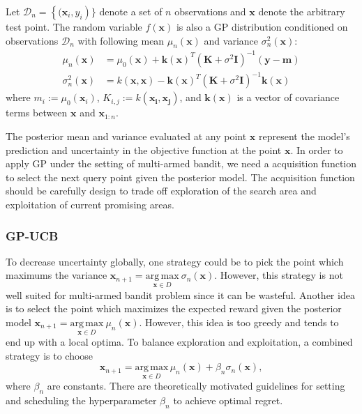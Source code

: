 \documentclass{article}
\begin{document}
Let $\mathcal{D}_n = \left \{( \mathbf{x}_i, y_i \right )\}$ denote a
set of $n$ observations and $\mathbf{x}$ denote the arbitrary test
point. The random variable $f(\mathbf{x})$ is also a GP distribution
conditioned on observations $\mathcal{D}_n$ with following mean
$\mu_n(\mathbf{x})$ and variance $\sigma_n^2(\mathbf{x})$:
\begin{align}
 \mu_n(\mathbf{x}) &= \mu_0(\mathbf{x}) +
                     \mathbf{k}(\mathbf{x})^T(\mathbf{K}+\sigma^2\mathbf{I})^{-1}(\mathbf{y}-\mathbf{m})
  \\
  \sigma_n^2(\mathbf{x}) &= k(\mathbf{x}, \mathbf{x}) -
                           \mathbf{k}(\mathbf{x})^T(\mathbf{K}+\sigma^2\mathbf{I})^{-1}\mathbf{k}(\mathbf{x})
\end{align}
where $m_i := \mu_0(\mathbf{x}_i)$, $K_{i,j} := k(\mathbf{x_i, x_j})$,
and $\mathbf{k}(\mathbf{x})$ is a vector of covariance terms between
$\mathbf{x}$ and $\mathbf{x}_{1:n}$.

The posterior mean and variance evaluated at any point $\mathbf{x}$
represent the model's prediction and uncertainty in the objective
function at the point $\mathbf{x}$. In order to apply GP under the
setting of multi-armed bandit, we need a acquisition function to select
the next query point given the posterior model. The acquisition
function should be carefully design to trade off exploration of the
search area and exploitation of current promising areas.

\subsubsection{GP-UCB}
To decrease uncertainty globally, one strategy could be to pick the
point which maximums the variance $\mathbf{x}_{n+1}=
\underset{\mathbf{x} \in
  D}{\mathrm{arg\,max}}~\sigma_n(\mathbf{x})$. However, this strategy
is not well suited for multi-armed bandit problem since it can be
wasteful. Another idea is to
select the point which maximizes the expected reward given the
posterior model $\mathbf{x}_{n+1}=
\underset{\mathbf{x} \in
  D}{\mathrm{arg\,max}}~\mu_n(\mathbf{x})$. However, this idea is too
greedy and tends to end up with a local optima. To balance exploration
and exploitation, a combined strategy is to choose
\begin{equation}
  \mathbf{x}_{n+1} = \underset{\mathbf{x} \in D}{\mathrm{arg \,
      max}}\,\mu_n(\mathbf{x})+\beta_n \sigma_n(\mathbf{x}),
\end{equation} \label{eq:gp-ucb-query}
where $\beta_n$ are constants. There are theoretically motivated
guidelines for setting and scheduling the hyperparameter $\beta_n$ to
achieve optimal regret.
\end{document}
